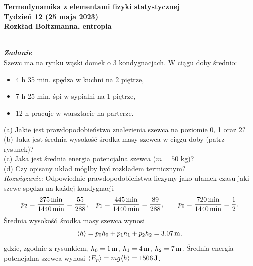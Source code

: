 \documentclass[11pt,a4paper]{article}
\newcounter{zadanie}\newcommand{\zadanie}[1][]{\addtocounter{zadanie}{1} ~\\  {\bf \emph{Zadanie \arabic{zadanie} #1 }} \\}
\begin{document}
\begin{centering}
\bf{\Large{Termodynamika z elementami fizyki statystycznej}}\\
Tydzień 12 (25 maja 2023)\\[5mm]
Rozkład Boltzmanna, entropia \\
\end{centering} 
\vspace{5mm}

\begin{figure}\vspace{-5mm}
\end{figure}
\zadanie
Szewc ma na rynku wąski domek o 3 kondygnacjach. W ciągu doby średnio:
\begin{itemize}
\item 4 h 35 min. spędza w kuchni na 2 piętrze,
\item 7 h 25 min. śpi w sypialni na 1 piętrze,
\item 12 h pracuje w warsztacie na parterze.
\end{itemize}
(a) Jakie jest prawdopodobieństwo znalezienia szewca na poziomie 0, 1 oraz 2?\\
(b) Jaka jest średnia wysokość środka masy szewca w ciągu doby (patrz rysunek)?\\
(c) Jaka jest średnia energia potencjalna szewca ($m=50$ kg)?\\
(d) Czy opisany układ mógłby być rozkładem termicznym? \\

{\em Rozwiązanie:} Odpowiednie prawdopodobieństwa liczymy jako ułamek czasu jaki szewc spędza na każdej kondygnacji
\begin{equation}
	p_2 = \frac{275\,{\rm min}}{1440\,{\rm min}} = \frac{55}{288}, \quad p_1 = \frac{445\,{\rm min}}{1440\,{\rm min}} = \frac{89}{288}, \qquad  p_0 = \frac{720\,{\rm min}}{1440\,{\rm min}} = \frac{1}{2}.
\end{equation}
Średnia wysokość środka masy szewca wynosi
\begin{equation}
	\langle h \rangle = p_0 h_0 + p_1 h_1 + p_2 h_2 = 3.07\,{\rm m},
\end{equation}
gdzie, zgodnie z rysunkiem, $h_0 = 1\,{\rm m}$, $h_1 = 4\,{\rm m}$, $h_2 = 7\,{\rm m}$. Średnia energia potencjalna szewca wynosi $\langle E_p \rangle = m g \langle h \rangle = 1506\,{\rm J}$.
\end{document}
